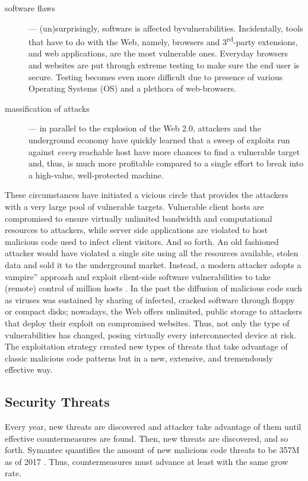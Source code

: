 \documentclass[12pt]{article}
\theoremstyle{definition}
\begin{document}
		
		\begin{description}
			\item[software flaws] --- (un)surprisingly, software is affected byvulnerabilities. Incidentally, tools that have to do with the Web,
			namely, browsers and 3\textsuperscript{rd}-party extensions, and web
			applications, are the most vulnerable ones. Everyday browsers and websites are put through extreme testing to make sure the end user is secure. Testing becomes even more difficult due to presence of various Operating Systems (OS) and a plethora of web-browsers.
			
			\item[massification of attacks] --- in parallel to the explosion of the Web 2.0, attackers and the underground economy have quickly learned that a sweep of exploits run against \emph{every} reachable host have more chances to find a vulnerable target and, thus, is much more profitable compared to a single effort to break into a high-value, well-protected machine.
		\end{description}
		
		These circumstances have initiated a vicious circle that provides the attackers with a very large pool of vulnerable targets. Vulnerable client hosts are compromised to ensure virtually unlimited bandwidth and computational resources to attackers, while server side applications are violated to host malicious code used to infect client visitors. And so forth. An old fashioned attacker would have violated a single site using all the resources available, stolen data and sold it to the underground market. Instead, a modern attacker adopts a vampire'' approach and exploit client-side software vulnerabilities to take (remote) control of million hosts \cite{Gautam2016}. In the past the diffusion of malicious code such as viruses was sustained by sharing of infected, cracked software through floppy or compact disks; nowadays, the Web offers unlimited, public storage to attackers that deploy their exploit on compromised websites.
 		 Thus, not only the type of vulnerabilities has changed, posing virtually every interconnected device at risk\cite{Iqbal2016}. The exploitation strategy created new types of threats that take advantage of classic malicious code patterns but in a new, extensive, and tremendously effective way.
		
		
		
		\subsection{Security Threats}\label{intro:threats}
		Every year, new threats are discovered and attacker take advantage of them until effective countermeasures are found. Then, new threats are discovered, and so forth. \textsf{Symantec} quantifies the amount of new malicious code threats to be 357M as of 2017 \cite{symantec_threat_report_2017}. Thus, countermeasures must advance at least with the same grow rate.\\
		
\end{document}
